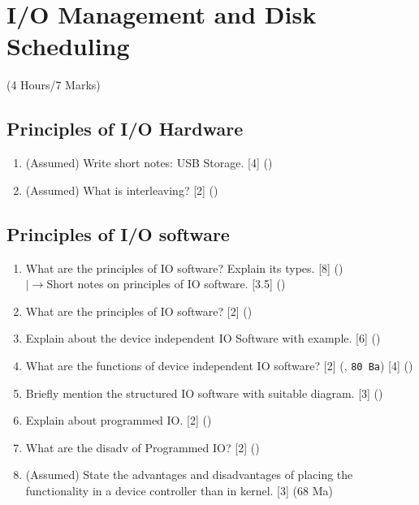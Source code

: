 \documentclass[12pt]{article}
\newcommand{\lb}{\\$\left|\rightarrow\right.$}
\begin{document}
	\pagebreak

\section{I/O Management and Disk Scheduling}
	\begin{center}(4 Hours/7 Marks)\end{center}
	\subsection{Principles of I/O Hardware}
		\begin{enumerate}
			\item (Assumed) Write short notes: USB Storage. \hfill [4] ()

			\item (Assumed) What is interleaving? \hfill [2] ()
		\end{enumerate}

	\subsection{Principles of I/O software}
		\begin{enumerate}
			\item What are the principles of IO software? Explain its types. \hfill [8] ()
			\lb Short notes on principles of IO software. \hfill [3.5] ()

			\item What are the principles of IO software? \hfill [2] ()

			\item Explain about the device independent IO Software with example. \hfill [6] ()

			\item What are the functions of device independent IO software? \hfill [2] (, \texttt{80 Ba}) [4] ()

			\item Briefly mention the structured IO software with suitable diagram. \hfill [3] ()

			\item Explain about programmed IO. \hfill [2] ()

			\item What are the disadv of Programmed IO? \hfill [2] ()

			\item (Assumed) State the advantages and disadvantages of placing the functionality in a device controller than in kernel. \hfill [3] (68 Ma)
		\end{enumerate}
\end{document}

